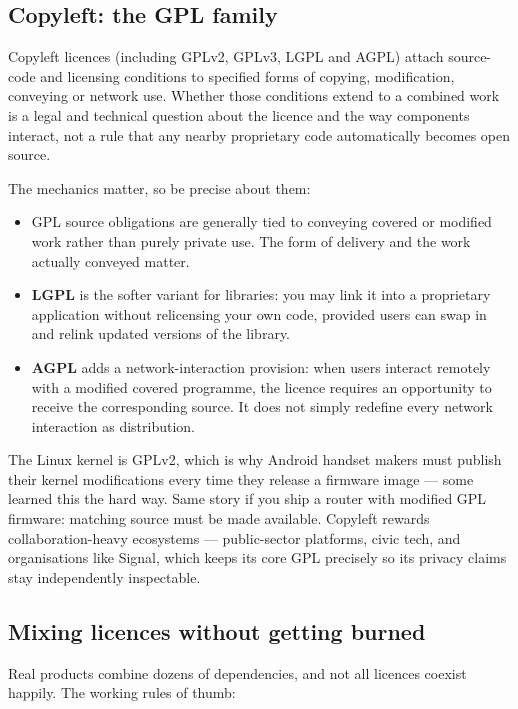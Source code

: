 \subsection{Copyleft: the GPL family}


Copyleft licences (including GPLv2, GPLv3, LGPL and AGPL) attach source-code and licensing conditions to specified forms of copying, modification, conveying or network use. Whether those conditions extend to a combined work is a legal and technical question about the licence and the way components interact, not a rule that any nearby proprietary code automatically becomes open source. \autocite{gnu-licenses}


The mechanics matter, so be precise about them:


\begin{itemize}[leftmargin=*]
\item GPL source obligations are generally tied to conveying covered or modified work rather than purely private use. The form of delivery and the work actually conveyed matter.
\item \textbf{LGPL} is the softer variant for libraries: you may link it into a proprietary application without relicensing your own code, provided users can swap in and relink updated versions of the library.
\item \textbf{AGPL} adds a network-interaction provision: when users interact remotely with a modified covered programme, the licence requires an opportunity to receive the corresponding source. It does not simply redefine every network interaction as distribution.
\end{itemize}

The Linux kernel is GPLv2, which is why Android handset makers must publish their kernel modifications every time they release a firmware image — some learned this the hard way. Same story if you ship a router with modified GPL firmware: matching source must be made available. Copyleft rewards collaboration-heavy ecosystems — public-sector platforms, civic tech, and organisations like Signal, which keeps its core GPL precisely so its privacy claims stay independently inspectable.



\subsection{Mixing licences without getting burned}


Real products combine dozens of dependencies, and not all licences coexist happily. The working rules of thumb:


